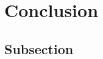 \documentclass[main]{subfiles}
\begin{document}
\section{Conclusion}
\subsection{Subsection}
\end{document}
